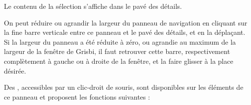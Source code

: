 Le contenu de la sélection s'affiche dans le pavé des détails. 

On peut réduire ou agrandir la largeur du panneau de navigation en cliquant sur la fine barre verticale entre ce panneau et le pavé des détails, et en la déplaçant. Si la largeur du panneau a été réduite à zéro, ou agrandie au maximum de la largeur de la fenêtre de Grisbi, il faut retrouver cette barre, respectivement complètement à gauche ou à droite de la fenêtre, et la faire glisser à la place désirée. 

Des , accessibles par un clic-droit de souris, sont disponibles sur les éléments de ce panneau et proposent les fonctions suivantes :

